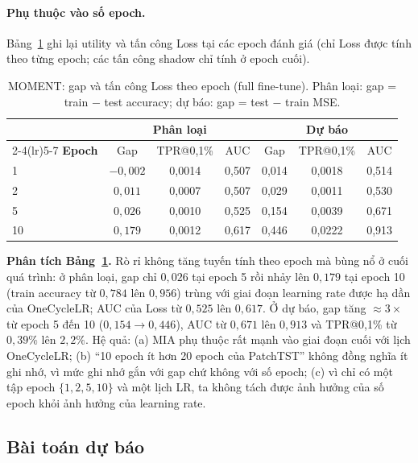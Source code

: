\documentclass[12pt,a4paper]{report}
\begin{document}
\paragraph{Phụ thuộc vào số epoch.} Bảng~\ref{tab:epoch} ghi lại utility và tấn công Loss tại các epoch đánh giá (chỉ Loss được tính theo từng epoch; các tấn công shadow chỉ tính ở epoch cuối).

\begin{table}[H]
\centering
\caption{MOMENT: gap và tấn công Loss theo epoch (full fine-tune). Phân loại: gap = train $-$ test accuracy; dự báo: gap = test $-$ train MSE.}
\label{tab:epoch}
\begin{tabular}{lcccccc}
\toprule
 & \multicolumn{3}{c}{\textbf{Phân loại}} & \multicolumn{3}{c}{\textbf{Dự báo}} \\
\cmidrule(lr){2-4}\cmidrule(lr){5-7}
\textbf{Epoch} & Gap & TPR@0,1\% & AUC & Gap & TPR@0,1\% & AUC \\
\midrule
1  & $-0{,}002$ & 0,0014 & 0,507 & 0,014 & 0,0018 & 0,514 \\
2  & $0{,}011$  & 0,0007 & 0,507 & 0,029 & 0,0011 & 0,530 \\
5  & $0{,}026$  & 0,0010 & 0,525 & 0,154 & 0,0039 & 0,671 \\
10 & $0{,}179$  & 0,0012 & 0,617 & 0,446 & 0,0222 & 0,913 \\
\bottomrule
\end{tabular}
\end{table}

\textbf{Phân tích Bảng~\ref{tab:epoch}.} Rò rỉ không tăng tuyến tính theo epoch mà bùng nổ ở cuối quá trình: ở phân loại, gap chỉ $0{,}026$ tại epoch 5 rồi nhảy lên $0{,}179$ tại epoch 10 (train accuracy từ $0{,}784$ lên $0{,}956$) trùng với giai đoạn learning rate được hạ dần của OneCycleLR; AUC của Loss từ $0{,}525$ lên $0{,}617$. Ở dự báo, gap tăng $\approx 3\times$ từ epoch 5 đến 10 ($0{,}154 \to 0{,}446$), AUC từ $0{,}671$ lên $0{,}913$ và TPR@0,1\% từ $0{,}39\%$ lên $2{,}2\%$. Hệ quả: (a) MIA phụ thuộc rất mạnh vào giai đoạn cuối với lịch OneCycleLR; (b) ``10 epoch ít hơn 20 epoch của PatchTST'' không đồng nghĩa ít ghi nhớ, vì mức ghi nhớ gắn với gap chứ không với số epoch; (c) vì chỉ có một tập epoch $\{1, 2, 5, 10\}$ và một lịch LR, ta không tách được ảnh hưởng của số epoch khỏi ảnh hưởng của learning rate.

\subsection{Bài toán dự báo}
\end{document}
